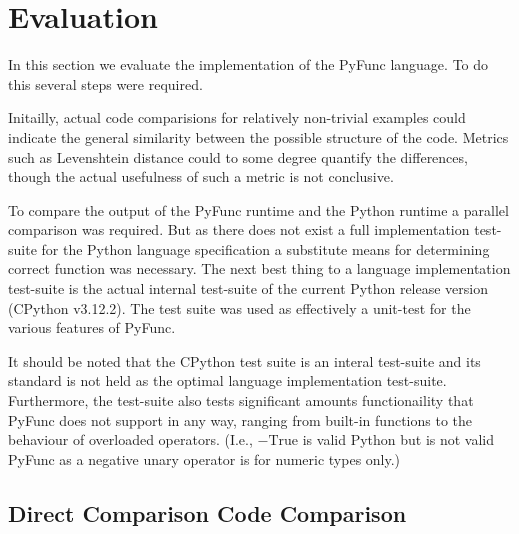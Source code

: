 \documentclass{l4proj}
\begin{document}




\chapter{Evaluation} 

In this section we evaluate the implementation of the PyFunc language.
To do this several steps were required.

Initailly, actual code comparisions for relatively non-trivial examples could indicate the general similarity between the possible structure of the code.
Metrics such as Levenshtein distance could to some degree quantify the differences, though the actual usefulness of such a metric is not conclusive.

To compare the output of the PyFunc runtime and the Python runtime a parallel comparison was required.
But as there does not exist a full implementation test-suite for the Python language specification a substitute means for determining correct function was necessary.
The next best thing to a language implementation test-suite is the actual internal test-suite of the current Python release version (CPython v3.12.2).
The test suite was used as effectively a unit-test for the various features of PyFunc.

It should be noted that the CPython test suite is an interal test-suite and its standard is not held as the optimal language implementation test-suite.
Furthermore, the test-suite also tests significant amounts functionaility that PyFunc does not support in any way, ranging from built-in functions to the behaviour of overloaded operators.
(I.e., $-\text{True}$ is valid Python but is not valid PyFunc as a negative unary operator is for numeric types only.)

\section{Direct Comparison Code Comparison}
\end{document}
